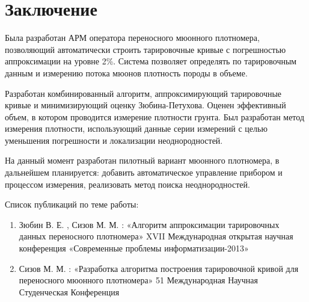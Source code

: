 \chapter*{Заключение}						%

Была разработан АРМ оператора переносного мюонного плотномера, позволяющий автоматически строить тарировочные кривые с
погрешностью аппроксимации на уровне 2\%. Система позволяет определять по тарировочным данным и измерению потока мюонов 
плотность породы в объеме. 

Разработан комбинированный алгоритм, аппроксимирующий тарировочные кривые и минимизирующий оценку Зюбина-Петухова. Оценен эффективный объем, в котором проводится измерение плотности грунта. Был разработан 
метод измерения плотности, использующий данные серии измерений с целью уменьшения погрешности и локализации 
неоднородностей.

На данный момент разработан пилотный вариант мюонного плотномера, в дальнейшем планируется: добавить автоматическое 
управление прибором и процессом измерения, реализовать метод поиска неоднородностей.

Список публикаций по теме работы:
\begin{enumerate}

\item Зюбин В. Е. , Сизов М. М. : «Алгоритм аппроксимации тарировочных данных переносного плотномера» XVII Международная открытая научная конференция «Современные проблемы информатизации-2013»

\item Сизов М. М. : «Разработка алгоритма построения тарировочной кривой для переносного мюонного плотномера» 51 Международная Научная Студенческая Конференция 
\end{enumerate}

\clearpage